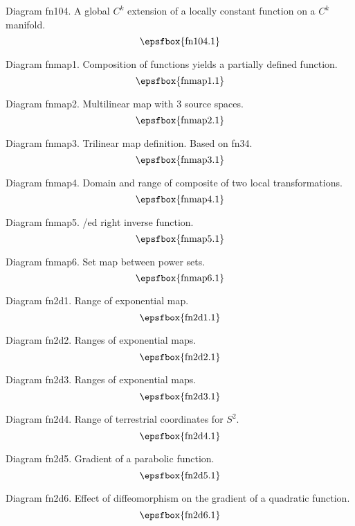 \filleject

Diagram fn104. A global $C^k$ extension of a locally constant function on a
$C^k$ manifold.
$$
\centerline{\epsfbox{fn104.1}}
$$

\secteject
\edef\SECTfnmap{\the\pageno}

Diagram fnmap1. Composition of functions yields a partially defined function.
$$
\centerline{\epsfbox{fnmap1.1}}
$$

Diagram fnmap2. Multilinear map with 3 source spaces.
$$
\centerline{\epsfbox{fnmap2.1}}
$$

Diagram fnmap3. Trilinear map definition. Based on fn34.
$$
\centerline{\epsfbox{fnmap3.1}}
$$

Diagram fnmap4. Domain and range of composite of two local transformations.
$$
\centerline{\epsfbox{fnmap4.1}}
$$

\filleject

Diagram fnmap5. \Generalis/ed right inverse function.
$$
\centerline{\epsfbox{fnmap5.1}}
$$

Diagram fnmap6. Set map between power sets.
$$
\centerline{\epsfbox{fnmap6.1}}
$$

\secteject
\edef\SECTfnTWOd{\the\pageno}

Diagram fn2d1. Range of exponential map.
$$
\centerline{\epsfbox{fn2d1.1}}
$$

Diagram fn2d2. Ranges of exponential maps.
$$
\centerline{\epsfbox{fn2d2.1}}
$$

Diagram fn2d3. Ranges of exponential maps.
$$
\centerline{\epsfbox{fn2d3.1}}
$$

\filleject

Diagram fn2d4. Range of terrestrial coordinates for $S^2$.
$$
\centerline{\epsfbox{fn2d4.1}}
$$

Diagram fn2d5. Gradient of a parabolic function.
$$
\centerline{\epsfbox{fn2d5.1}}
$$

Diagram fn2d6. Effect of diffeomorphism on the gradient of a quadratic function.
$$
\centerline{\epsfbox{fn2d6.1}}
$$

\filleject

